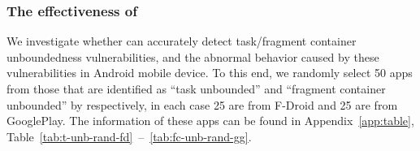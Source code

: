 


\subsubsection{The effectiveness of \tool} \label{sec:manual}
We investigate whether {\tool} can accurately detect task/fragment container unboundedness vulnerabilities, and the abnormal behavior caused by these vulnerabilities in Android mobile device.  
To this end, we randomly select 50 apps from those that are identified as ``task unbounded'' and  ``fragment container unbounded'' by {\tool} respectively, in each case 25 are from F-Droid and 25 are from GooglePlay.
The information of these apps can be found in  Appendix~\ref{app:table}, Table~\ref{tab:t-unb-rand-fd}~--~\ref{tab:fc-unb-rand-gg}. 


